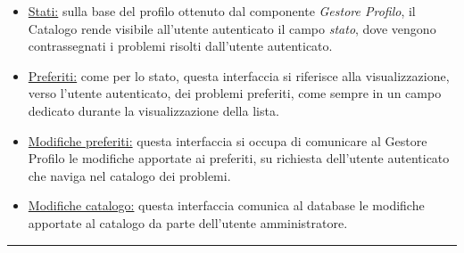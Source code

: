 \documentclass[11pt, a4paper]{article}
\theoremstyle{definition} %
\begin{document}
\begin{description}
\begin{itemize}
        \item \underline{Stati:} sulla base del profilo ottenuto
        dal componente \textit{Gestore Profilo}, il Catalogo rende
        visibile all'utente autenticato il campo \textit{stato},
        dove vengono contrassegnati i problemi risolti dall'utente
        autenticato.

        \item \underline{Preferiti:} come per lo stato, questa
        interfaccia si riferisce alla visualizzazione, verso l'utente
        autenticato, dei problemi preferiti, come sempre in un
        campo dedicato durante la visualizzazione della lista.

        \item \underline{Modifiche preferiti:} questa interfaccia
        si occupa di comunicare al Gestore Profilo le modifiche
        apportate ai preferiti, su richiesta dell'utente autenticato
        che naviga nel catalogo dei problemi.

        \item \underline{Modifiche catalogo:} questa interfaccia
        comunica al database le modifiche apportate al catalogo
        da parte dell'utente amministratore.
    \end{itemize}
\end{description}

\begin{center}
    \rule{5cm}{1pt}
\end{center}
\end{document}
